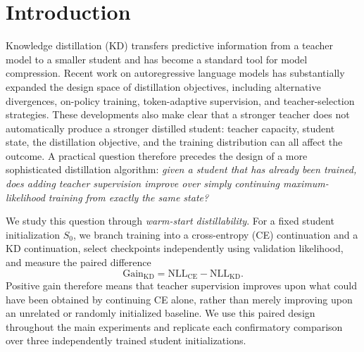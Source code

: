 \section{Introduction}\label{sec:introduction}
Knowledge distillation (KD) transfers predictive information from a teacher model to a smaller student and has become a standard tool for model compression. Recent work on autoregressive language models has substantially expanded the design space of distillation objectives, including alternative divergences, on-policy training, token-adaptive supervision, and teacher-selection strategies. These developments also make clear that a stronger teacher does not automatically produce a stronger distilled student: teacher capacity, student state, the distillation objective, and the training distribution can all affect the outcome. A practical question therefore precedes the design of a more sophisticated distillation algorithm: \emph{given a student that has already been trained, does adding teacher supervision improve over simply continuing maximum-likelihood training from exactly the same state?}

We study this question through \emph{warm-start distillability}. For a fixed student initialization $S_0$, we branch training into a cross-entropy (CE) continuation and a KD continuation, select checkpoints independently using validation likelihood, and measure the paired difference
\[
    \mathrm{Gain}_{\mathrm{KD}}
    =
    \mathrm{NLL}_{\mathrm{CE}}
    -
    \mathrm{NLL}_{\mathrm{KD}}.
\]
Positive gain therefore means that teacher supervision improves upon what could have been obtained by continuing CE alone, rather than merely improving upon an unrelated or randomly initialized baseline. We use this paired design throughout the main experiments and replicate each confirmatory comparison over three independently trained student initializations.

